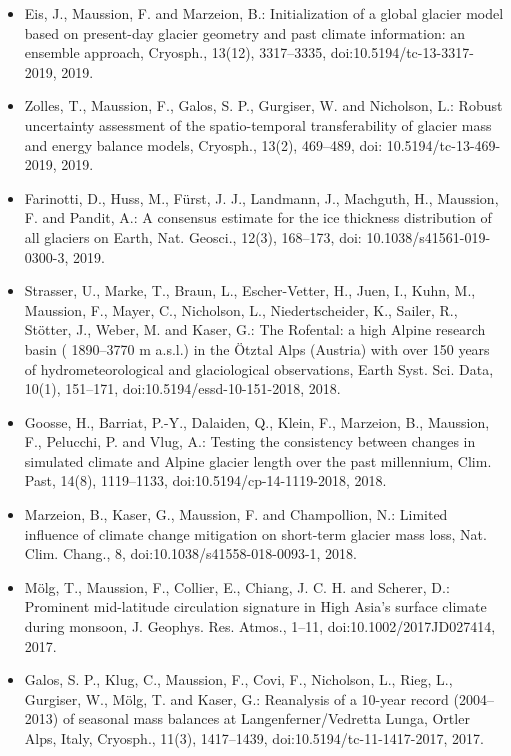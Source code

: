 \begin{footnotesize}
\begin{itemize}[nosep]
\item {} 
Eis, J., Maussion, F. and Marzeion, B.: Initialization of a global glacier model based on present-day glacier geometry
and past climate information: an ensemble approach, Cryosph., 13(12), 3317--3335, doi:10.5194/tc-13-3317-2019, 2019.

\item {} 
Zolles, T., Maussion, F., Galos, S. P., Gurgiser, W. and Nicholson, L.: Robust uncertainty assessment of the
spatio-temporal transferability of glacier mass and energy balance models, Cryosph., 13(2), 469--489, doi:
10.5194/tc-13-469-2019, 2019.

\item {} 
Farinotti, D., Huss, M., Fürst, J. J., Landmann, J., Machguth, H., Maussion, F. and Pandit, A.: A consensus estimate
for the ice thickness distribution of all glaciers on Earth, Nat. Geosci., 12(3), 168--173, doi:
10.1038/s41561-019-0300-3, 2019.

\item {} 
Strasser, U., Marke, T., Braun, L., Escher-Vetter, H., Juen, I., Kuhn, M., Maussion, F., Mayer, C., Nicholson, L.,
Niedertscheider, K., Sailer, R., Stötter, J., Weber, M. and Kaser, G.: The Rofental: a high Alpine research basin (
1890--3770 m a.s.l.) in the Ötztal Alps (Austria) with over 150 years of hydrometeorological and glaciological
observations, Earth Syst. Sci. Data, 10(1), 151--171, doi:10.5194/essd-10-151-2018, 2018.

\item {} 
Goosse, H., Barriat, P.-Y., Dalaiden, Q., Klein, F., Marzeion, B., Maussion, F., Pelucchi, P. and Vlug, A.: Testing
the consistency between changes in simulated climate and Alpine glacier length over the past millennium, Clim. Past,
14(8), 1119--1133, doi:10.5194/cp-14-1119-2018, 2018.

\item {} 
Marzeion, B., Kaser, G., Maussion, F. and Champollion, N.: Limited influence of climate change mitigation on
short-term glacier mass loss, Nat. Clim. Chang., 8, doi:10.1038/s41558-018-0093-1, 2018.

\item {} 
Mölg, T., Maussion, F., Collier, E., Chiang, J. C. H. and Scherer, D.: Prominent mid-latitude circulation signature in
High Asia’s surface climate during monsoon, J. Geophys. Res. Atmos., 1--11, doi:10.1002/2017JD027414, 2017.

\item {} 
Galos, S. P., Klug, C., Maussion, F., Covi, F., Nicholson, L., Rieg, L., Gurgiser, W., Mölg, T. and Kaser, G.:
Reanalysis of a 10-year record (2004--2013) of seasonal mass balances at Langenferner/Vedretta Lunga, Ortler Alps,
Italy, Cryosph., 11(3), 1417--1439, doi:10.5194/tc-11-1417-2017, 2017.


\end{itemize}
\end{footnotesize}
